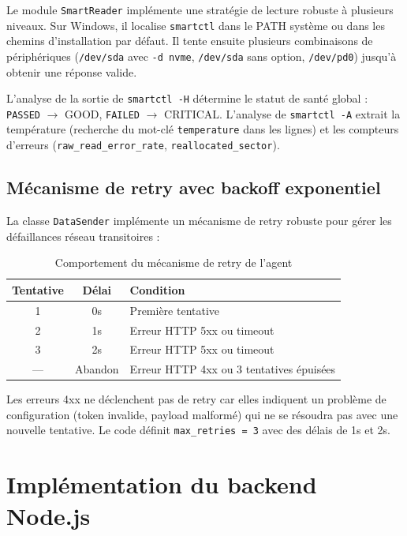 Le module \texttt{SmartReader} implémente une stratégie de lecture robuste à plusieurs
niveaux. Sur Windows, il localise \texttt{smartctl} dans le PATH système ou dans les
chemins d'installation par défaut. Il tente ensuite plusieurs combinaisons de
périphériques (\texttt{/dev/sda} avec \texttt{-d nvme}, \texttt{/dev/sda} sans option,
\texttt{/dev/pd0}) jusqu'à obtenir une réponse valide.

L'analyse de la sortie de \texttt{smartctl -H} détermine le statut de santé global :
\texttt{PASSED} $\rightarrow$ GOOD, \texttt{FAILED} $\rightarrow$ CRITICAL. L'analyse
de \texttt{smartctl -A} extrait la température (recherche du mot-clé \texttt{temperature}
dans les lignes) et les compteurs d'erreurs (\texttt{raw\_read\_error\_rate},
\texttt{reallocated\_sector}).

\subsection{Mécanisme de retry avec backoff exponentiel}

La classe \texttt{DataSender} implémente un mécanisme de retry robuste pour gérer les
défaillances réseau transitoires :

\begin{table}[H]
\centering
\caption{Comportement du mécanisme de retry de l'agent}
\begin{tabular}{|c|c|l|}
\hline
\rowcolor{lightblue}
\textbf{Tentative} & \textbf{Délai} & \textbf{Condition} \\
\hline
1 & 0s & Première tentative \\
\hline
2 & 1s & Erreur HTTP 5xx ou timeout \\
\hline
3 & 2s & Erreur HTTP 5xx ou timeout \\
\hline
— & Abandon & Erreur HTTP 4xx ou 3 tentatives épuisées \\
\hline
\end{tabular}
\end{table}

Les erreurs 4xx ne déclenchent pas de retry car elles indiquent un problème de
configuration (token invalide, payload malformé) qui ne se résoudra pas avec une
nouvelle tentative. Le code définit \texttt{max\_retries = 3} avec des délais de 1s et 2s.

\section{Implémentation du backend Node.js}


